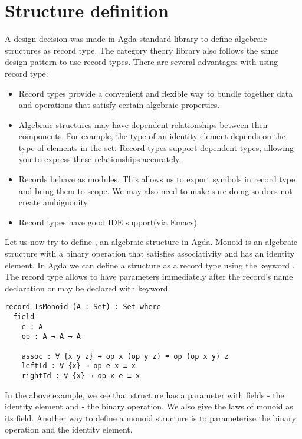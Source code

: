 \section{Structure definition}
A design decision was made in Agda standard library to define algebraic
structures as record type. The category theory library \cite{hu2021formalizing}
also follows the same design pattern to use record types. There are several
advantages with using record type:
\begin{itemize}
  \item Record types provide a convenient and flexible way to bundle
  together data and operations that satisfy certain algebraic properties. 
  \item Algebraic structures may have dependent relationships between their
  components. For example, the type of an identity element depends on the type
  of elements in the set. Record types support dependent types,
  allowing you to express these relationships accurately.
  \item Records behave as modules. This allows us to export symbols in record
  type and bring them to scope. We may also need to make sure doing so does not
  create ambiguouity.
  \item Record types have good IDE support(via Emacs)
\end{itemize}

Let us now try to define , an algebraic structure in Agda.
Monoid is an algebraic structure with a binary operation that satisfies
associativity and has an identity element. In Agda we can define a structure as
a record type using the keyword . The record type allows to have
parameters immediately after the record's name declaration or may be declared
with  keyword.

\begin{verbatim}
record IsMonoid (A : Set) : Set where
  field
    e : A           
    op : A → A → A  

    assoc : ∀ {x y z} → op x (op y z) ≡ op (op x y) z
    leftId : ∀ {x} → op e x ≡ x
    rightId : ∀ {x} → op x e ≡ x  
\end{verbatim}

In the above example, we see that  structure has a parameter
 with fields  - the identity element and  -
the binary operation. We also give the laws of monoid as its field. Another way
to define a monoid structure is to parameterize the binary operation and the identity element.

